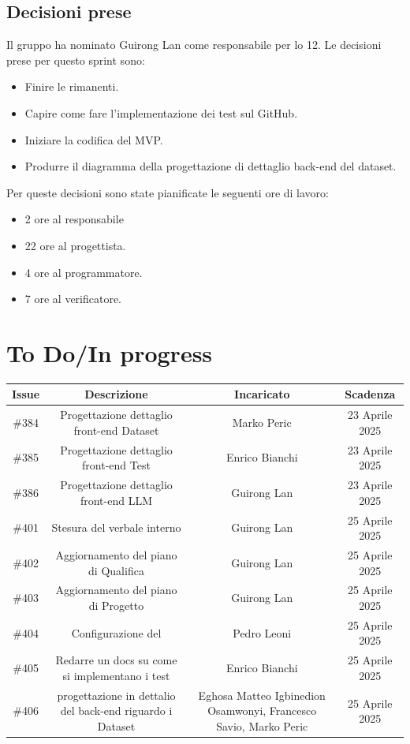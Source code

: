 \documentclass[a4paper, 12pt]{article}
\begin{document}
\subsection{Decisioni prese}
    Il gruppo ha nominato Guirong Lan come responsabile per lo  12.
    Le decisioni prese per questo sprint sono:
    \begin{itemize}
        \item Finire le  rimanenti.
        \item Capire come fare l'implementazione dei test sul GitHub.
        \item Iniziare la codifica del MVP.
        \item Produrre il diagramma della progettazione di dettaglio back-end del dataset.
    \end{itemize}
    Per queste decisioni sono state pianificate le seguenti ore di lavoro:
    \begin{itemize}  
        \item 2 ore al responsabile
        \item 22 ore al progettista.
        \item 4 ore al programmatore.
        \item 7 ore al verificatore.
    \end{itemize}

\section{To Do/In progress}
\begin{tabularx}{\textwidth}{|c|C|C|C|}
    \hline
        \textbf{Issue} & \textbf{Descrizione} & \textbf{Incaricato} & \textbf{Scadenza}\\
    \hline
        \#384 & Progettazione dettaglio front-end Dataset & Marko Peric & 23 Aprile 2025\\
    \hline
        \#385 & Progettazione dettaglio front-end Test & Enrico Bianchi & 23 Aprile 2025\\
    \hline
        \#386 & Progettazione dettaglio front-end LLM & Guirong Lan & 23 Aprile 2025\\
    \hline
        \#401 & Stesura del verbale interno & Guirong Lan & 25 Aprile 2025\\
    \hline
        \#402 & Aggiornamento del piano di Qualifica & Guirong Lan & 25 Aprile 2025\\
    \hline
        \#403 & Aggiornamento del piano di Progetto & Guirong Lan & 25 Aprile 2025\\
    \hline
        \#404 & Configurazione del  & Pedro Leoni & 25 Aprile 2025\\
    \hline
        \#405 & Redarre un docs su come si implementano i test & Enrico Bianchi & 25 Aprile 2025\\
    \hline
        \#406 & progettazione in dettalio del back-end riguardo i Dataset & Eghosa Matteo Igbinedion Osamwonyi, Francesco Savio, Marko Peric & 25 Aprile 2025\\
    \hline
    \end{tabularx}
\end{document}
